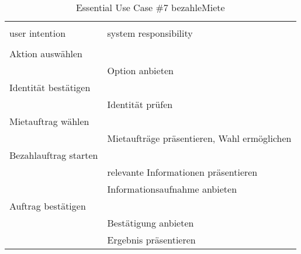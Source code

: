 \begin{table}[H]
\caption{Essential Use Case \#7 bezahleMiete }
\centering
\begin{tabular}{l l}
\\ [-0.5ex]

\hline\hline
\\ [-0.5ex]
user intention & system responsibility
\\ [1.5ex]
\hline
\\ [-0.5ex]
Aktion auswählen	 		& 											 \\[1ex]
							& Option anbieten							 \\[1ex]
Identität bestätigen		& 											 \\[1ex]
							& Identität prüfen							 \\[1ex]
Mietauftrag wählen		  	& 											 \\[1ex] 
							& Mietaufträge präsentieren, Wahl ermöglichen\\[1ex]
Bezahlauftrag starten		& 											 \\[1ex]
							& relevante Informationen präsentieren		 \\[1ex]
							& Informationsaufnahme anbieten	     		 \\[1ex]
Auftrag bestätigen			&	     									 \\[1ex]
							& Bestätigung anbieten				   		 \\[1ex]
							& Ergebnis präsentieren			    		 \\[1ex]

\hline
\end{tabular}
\label{tab:statuscodes}
\end{table}

